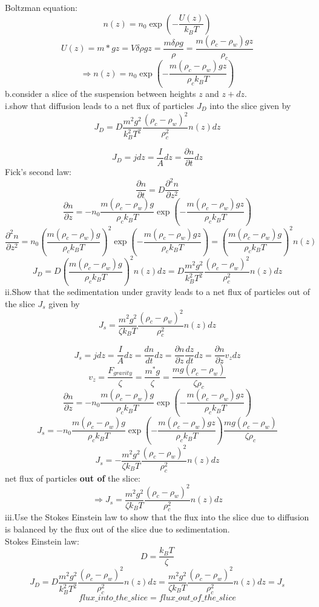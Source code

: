 \documentclass[a4paper,12pt]{report}
\begin{document}
Boltzman equation:
\[
n(z) = n_0 \exp(-\frac{U(z)}{k_BT})
\]
\[
U(z) = m*gz = V\delta \rho gz = \frac{m\delta \rho g}{\rho}= \frac{m(\rho_c - \rho_w)gz}{\rho_c}
\]
\[
\Rightarrow n(z) = n_0\exp(-\frac{m(\rho_c - \rho_w)gz}{\rho_ck_BT}) 
\]
b.consider a slice of the suspension between heights $z$ and $z+dz$.\\i.show that diffusion leads to a net flux of particles $J_D$ into the slice given by
\[
J_D = D\frac{m^2 g^2}{k_{B}^2T^2}\frac{(\rho_c - \rho_w)^2}{\rho_{c}^2}n(z)dz
\]

\[
J_D =jdz = \frac{I}{A}dz = \frac{\partial n}{\partial t}dz
\]
Fick's second law:
\[
\frac{\partial n}{\partial t} = D\frac{\partial^2 n}{\partial z^2}
\]
\[
\frac{\partial n}{\partial z}=-n_0\frac{m(\rho_c - \rho_w)g}{\rho_ck_BT}\exp(-\frac{m(\rho_c - \rho_w)gz}{\rho_ck_BT})
\]
\[
\frac{\partial^2 n}{\partial z^2} = n_0(\frac{m(\rho_c - \rho_w)g}{\rho_ck_BT})^2\exp(-\frac{m(\rho_c - \rho_w)gz}{\rho_ck_BT}) = (\frac{m(\rho_c - \rho_w)g}{\rho_ck_BT})^2 n(z)
\]
\[
J_D = D (\frac{m(\rho_c - \rho_w)g}{\rho_ck_BT})^2 n(z) dz = D\frac{m^2 g^2}{k_{B}^2T^2}\frac{(\rho_c - \rho_w)^2}{\rho_{c}^2}n(z)dz
\]
ii.Show that the sedimentation under gravity leads to a net flux of particles out of the slice $J_s$ given by
\[
J_s = \frac{m^2 g^2}{\zeta k_{B}T}\frac{(\rho_c - \rho_w)^2}{\rho_{c}^2}n(z)dz
\]

\[
J_s = jdz = \frac{I}{A}dz = \frac{dn}{dt}dz = \frac{\partial n}{\partial z}\frac{dz}{dt}dz = \frac{\partial n}{\partial z}v_zdz
\]
\[
v_z=\frac{F_{gravity}}{\zeta} = \frac{m^*g}{\zeta} =\frac{m g(\rho_c - \rho_w)}{\zeta \rho_{c}}
\]
\[
\frac{\partial n}{\partial z} = -n_0\frac{m(\rho_c - \rho_w)g}{\rho_ck_BT}\exp(-\frac{m(\rho_c - \rho_w)gz}{\rho_ck_BT})
\]
\[
J_s = -n_0\frac{m(\rho_c - \rho_w)g}{\rho_ck_BT}\exp(-\frac{m(\rho_c - \rho_w)gz}{\rho_ck_BT}) \frac{m g(\rho_c - \rho_w)}{\zeta \rho_{c}}
\]
\[
J_s = -\frac{m^2 g^2}{\zeta k_{B}T}\frac{(\rho_c - \rho_w)^2}{\rho_{c}^2}n(z)dz
\]
net flux of particles \textbf{out of} the slice:
\[
\Rightarrow J_s = \frac{m^2 g^2}{\zeta k_{B}T}\frac{(\rho_c - \rho_w)^2}{\rho_{c}^2}n(z)dz
\]
iii.Use the Stokes Einstein law to show that the flux into the slice due to diffusion is balanced by the flux out of the slice due to sedimentation.
\\
Stokes Einstein law:
\[
D = \frac{k_BT}{\zeta}
\]
\[
J_D = D\frac{m^2 g^2}{k_{B}^2T^2}\frac{(\rho_c - \rho_w)^2}{\rho_{c}^2}n(z)dz = \frac{m^2 g^2}{\zeta k_{B}T}\frac{(\rho_c - \rho_w)^2}{\rho_{c}^2}n(z)dz = J_s
\]
\[
flux\_into\_the\_slice = flux\_out\_of\_the\_slice
\]
\end{document}
